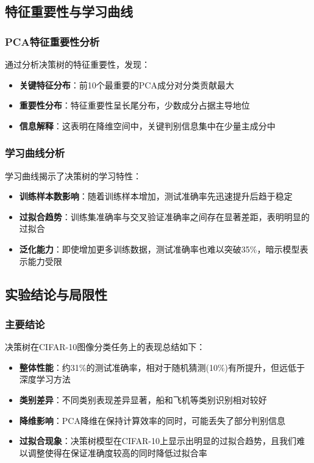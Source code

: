 \documentclass[UTF8]{report}
\theoremstyle{MyLineTheoremStyle} %
\theoremstyle{MyBlockTheoremStyle} %
\theoremstyle{MySubsubsectionStyle} %
\begin{document}
\subsection{特征重要性与学习曲线}

\subsubsection{PCA特征重要性分析}
通过分析决策树的特征重要性，发现：
\begin{itemize}
    \item \textbf{关键特征分布}：前10个最重要的PCA成分对分类贡献最大
    \item \textbf{重要性分布}：特征重要性呈长尾分布，少数成分占据主导地位
    \item \textbf{信息解释}：这表明在降维空间中，关键判别信息集中在少量主成分中
\end{itemize}

\subsubsection{学习曲线分析}
学习曲线揭示了决策树的学习特性：
\begin{itemize}
    \item \textbf{训练样本数影响}：随着训练样本增加，测试准确率先迅速提升后趋于稳定
    \item \textbf{过拟合趋势}：训练集准确率与交叉验证准确率之间存在显著差距，表明明显的过拟合
    \item \textbf{泛化能力}：即使增加更多训练数据，测试准确率也难以突破35\%，暗示模型表示能力受限
\end{itemize}

\subsection{实验结论与局限性}

\subsubsection{主要结论}
决策树在CIFAR-10图像分类任务上的表现总结如下：
\begin{itemize}
    \item \textbf{整体性能}：约31\%的测试准确率，相对于随机猜测(10\%)有所提升，但远低于深度学习方法
    \item \textbf{类别差异}：不同类别表现差异显著，船和飞机等类别识别相对较好
    \item \textbf{降维影响}：PCA降维在保持计算效率的同时，可能丢失了部分判别信息
    \item \textbf{过拟合现象}：决策树模型在CIFAR-10上显示出明显的过拟合趋势，且我们难以调整使得在保证准确度较高的同时降低过拟合率
\end{itemize}
\end{document}
